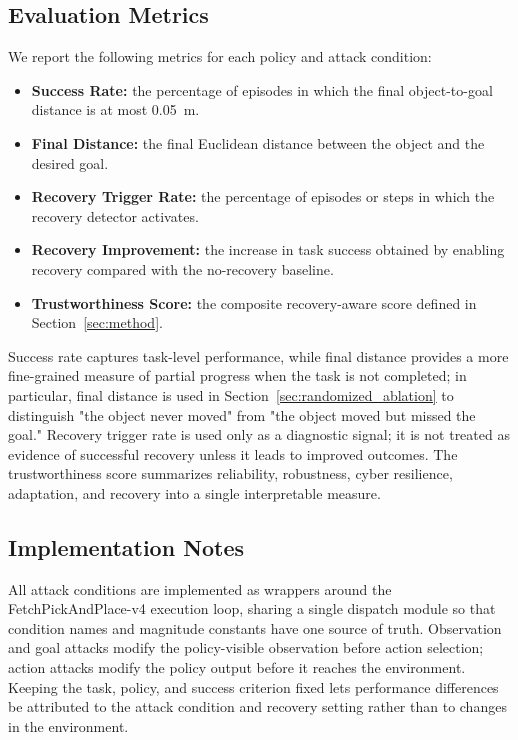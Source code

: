 \documentclass[conference]{IEEEtran}
\begin{document}
\subsection{Evaluation Metrics}

We report the following metrics for each policy and attack condition:

\begin{itemize}
    \item \textbf{Success Rate:} the percentage of episodes in which the final
    object-to-goal distance is at most 0.05~m.
    \item \textbf{Final Distance:} the final Euclidean distance between the object
    and the desired goal.
    \item \textbf{Recovery Trigger Rate:} the percentage of episodes or steps in which
    the recovery detector activates.
    \item \textbf{Recovery Improvement:} the increase in task success obtained by
    enabling recovery compared with the no-recovery baseline.
    \item \textbf{Trustworthiness Score:} the composite recovery-aware score defined
    in Section~\ref{sec:method}.
\end{itemize}

Success rate captures task-level performance, while final distance provides a more
fine-grained measure of partial progress when the task is not completed; in particular,
final distance is used in Section~\ref{sec:randomized_ablation} to distinguish "the
object never moved" from "the object moved but missed the goal." Recovery trigger rate
is used only as a diagnostic signal; it is not treated as evidence of successful
recovery unless it leads to improved outcomes. The trustworthiness score summarizes
reliability, robustness, cyber resilience, adaptation, and recovery into a single
interpretable measure.

\subsection{Implementation Notes}

All attack conditions are implemented as wrappers around the FetchPickAndPlace-v4
execution loop, sharing a single dispatch module so that condition names and magnitude
constants have one source of truth. Observation and goal attacks modify the
policy-visible observation before action selection; action attacks modify the policy
output before it reaches the environment. Keeping the task, policy, and success
criterion fixed lets performance differences be attributed to the attack condition and
recovery setting rather than to changes in the environment.
\end{document}

